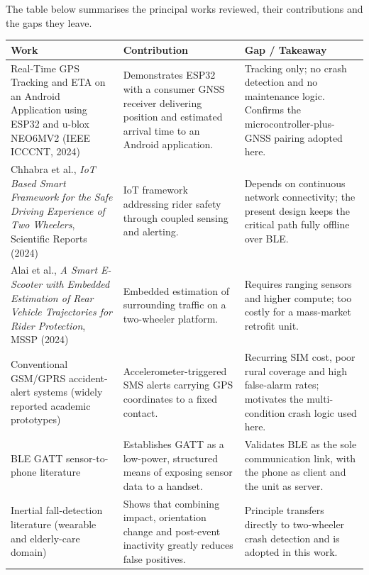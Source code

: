 \documentclass[12pt,a4paper,oneside]{report}
\begin{document}
The table below summarises the principal works reviewed, their contributions and the gaps
they leave.

\vspace{0.6em}
\begin{center}
\renewcommand{\arraystretch}{1.2}
\begin{singlespace}
\begin{tabular}{|L{1.55in}|L{1.75in}|L{2.05in}|}
\hline
\textbf{Work} & \textbf{Contribution} & \textbf{Gap / Takeaway}\\
\hline
Real-Time GPS Tracking and ETA on an Android Application using ESP32 and u-blox NEO6MV2
(IEEE ICCCNT, 2024)
& Demonstrates ESP32 with a consumer GNSS receiver delivering position and estimated arrival
time to an Android application.
& Tracking only; no crash detection and no maintenance logic. Confirms the
microcontroller-plus-GNSS pairing adopted here.\\
\hline
Chhabra et al., \textit{IoT Based Smart Framework for the Safe Driving Experience of Two
Wheelers}, Scientific Reports (2024)
& IoT framework addressing rider safety through coupled sensing and alerting.
& Depends on continuous network connectivity; the present design keeps the critical path
fully offline over BLE.\\
\hline
Alai et al., \textit{A Smart E-Scooter with Embedded Estimation of Rear Vehicle
Trajectories for Rider Protection}, MSSP (2024)
& Embedded estimation of surrounding traffic on a two-wheeler platform.
& Requires ranging sensors and higher compute; too costly for a mass-market retrofit
unit.\\
\hline
Conventional GSM/GPRS accident-alert systems (widely reported academic prototypes)
& Accelerometer-triggered SMS alerts carrying GPS coordinates to a fixed contact.
& Recurring SIM cost, poor rural coverage and high false-alarm rates; motivates the
multi-condition crash logic used here.\\
\hline
BLE GATT sensor-to-phone literature
& Establishes GATT as a low-power, structured means of exposing sensor data to a handset.
& Validates BLE as the sole communication link, with the phone as client and the unit as
server.\\
\hline
Inertial fall-detection literature (wearable and elderly-care domain)
& Shows that combining impact, orientation change and post-event inactivity greatly reduces
false positives.
& Principle transfers directly to two-wheeler crash detection and is adopted in this
work.\\
\hline
\end{tabular}
\end{singlespace}
\end{center}
\end{document}
